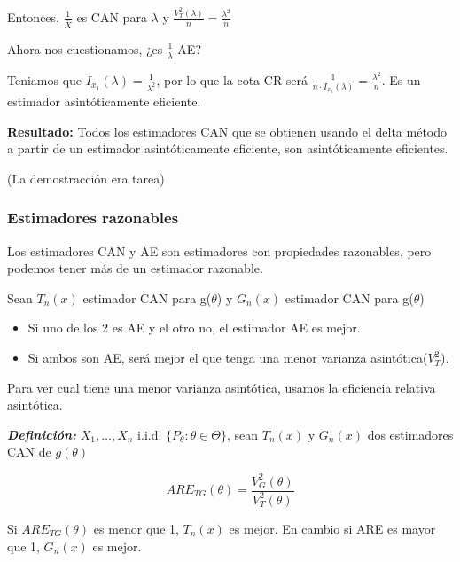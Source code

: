 Entonces, $\frac{1}{\bar{X}}$ es CAN para $\lambda$ y $\frac{V_T^2(\lambda)}{n}=\frac{\lambda^2}{n}$

Ahora nos cuestionamos, ¿es $\frac{1}{\lambda}$ AE?

Teniamos que $I_{x_1}(\lambda)=\frac{1}{\lambda^2}$, por lo que la cota CR será $\frac{1}{n \cdot I_{x_1}(\lambda)}=\frac{\lambda^2}{n}$.
Es un estimador asintóticamente eficiente.

\textbf{Resultado: }Todos los estimadores CAN que se obtienen usando el delta método a partir de un estimador asintóticamente eficiente,
son asintóticamente eficientes.

(La demostracción era tarea)

\subsubsection{Estimadores razonables}

Los estimadores CAN y AE son estimadores con propiedades razonables, pero podemos tener más de un estimador razonable.

Sean $T_n(x)$ estimador CAN para g($\theta$) y $G_n(x)$ estimador CAN para g($\theta$)
\begin{itemize}
    \item Si uno de los 2 es AE y el otro no, el estimador AE es mejor.
    \item Si ambos son AE, será mejor el que tenga una menor varianza asintótica($V_T^2$).
\end{itemize}

Para ver cual tiene una menor varianza asintótica, usamos la eficiencia relativa asintótica.

\textbf{\textit{Definición: }} $X_1,\dots,X_n$ i.i.d. $\{ P_\theta: \theta \in \Theta \}$, sean $T_n(x)$
y $G_n(x)$ dos estimadores CAN de $g(\theta)$

\[
    ARE_{TG}(\theta)=\frac{V_G^2(\theta)}{V_T^2(\theta)}
\]

Si $ARE_{TG}(\theta)$ es menor que 1, $T_n(x)$ es mejor. En cambio si ARE es mayor que 1, $G_n(x)$ es mejor.